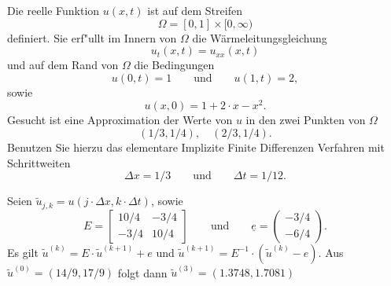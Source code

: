 Die reelle Funktion $u(x,t)$ ist auf dem Streifen
\[
\Omega = [0, 1] \times [0,\infty)
\]
definiert. Sie erf"ullt im Innern von $\Omega$ die W\"armeleitungsgleichung
\[
u_{t}(x,t) = u_{xx}(x,t)
\]
und auf dem Rand von $\Omega$ die Bedingungen
\[
u(0,t) = 1 \qquad \text{und} \qquad  u(1,t) = 2,
\]
sowie
\[
u(x,0) = 1 + 2 \cdot x - x^2.
\]
Gesucht ist eine Approximation der Werte von $u$ in den zwei Punkten von $\Omega$
\[
(1/3, 1/4), \quad  (2/3, 1/4).
\]
Benutzen Sie hierzu das elementare Implizite Finite Differenzen Verfahren mit Schrittweiten
\[
\Delta x = 1/3 \qquad  \text{und} \qquad \Delta t = 1/12.
\]

\begin{loesung}
Seien $\tilde u_{j,k} = u(j \cdot \Delta x, k \cdot \Delta t)$, sowie
\[
E
=
\left[
\begin{array}{rr}
10/4 & - 3/4 \\
-3/4 & 10/4
\end{array}\right]
\qquad
\text{und}
\qquad
\underline{e}
=
\begin{pmatrix}
-3/4 \\ -6/4
\end{pmatrix}.
\]
Es gilt $\tilde u^{(k)} = E \cdot \tilde u^{(k+1)} + e$
und $\tilde u^{(k+1)} = E^{-1} \cdot (\tilde u^{(k)} - e).$
Aus $\tilde u^{(0)} = (14/9, 17/9)$ folgt dann
$\tilde u^{(3)} = (1.3748, 1.7081)$
\end{loesung}


